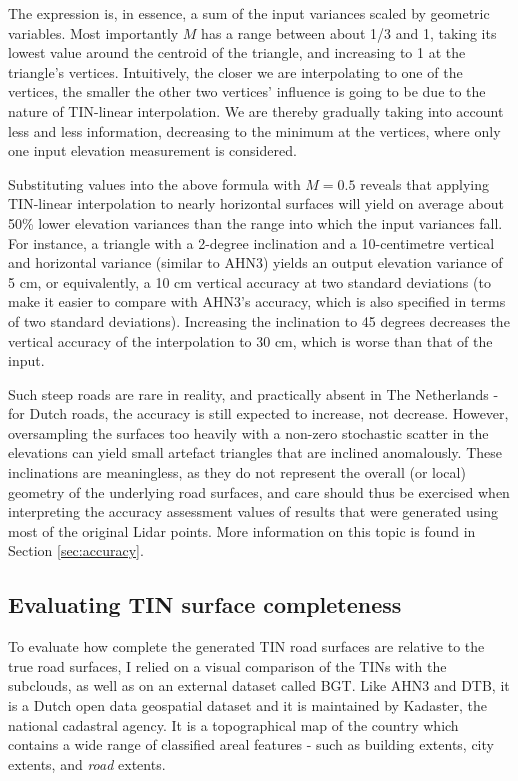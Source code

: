 The expression is, in essence, a sum of the input variances scaled by geometric variables. Most importantly $M$ has a range between about 1/3 and 1, taking its lowest value around the centroid of the triangle, and increasing to 1 at the triangle's vertices. Intuitively, the closer we are interpolating to one of the vertices, the smaller the other two vertices' influence is going to be due to the nature of TIN-linear interpolation. We are thereby gradually taking into account less and less information, decreasing to the minimum at the vertices, where only one input elevation measurement is considered.

Substituting values into the above formula with $M=0.5$ reveals that applying TIN-linear interpolation to nearly horizontal surfaces will yield on average about 50\% lower elevation variances than the range into which the input variances fall. For instance, a triangle with a 2-degree inclination and a 10-centimetre vertical and horizontal variance (similar to AHN3) yields an output elevation variance of 5 cm, or equivalently, a 10 cm vertical accuracy at two standard deviations (to make it easier to compare with AHN3's accuracy, which is also specified in terms of two standard deviations). Increasing the inclination to 45 degrees decreases the vertical accuracy of the interpolation to 30 cm, which is worse than that of the input.

Such steep roads are rare in reality, and practically absent in The Netherlands - for Dutch roads, the accuracy is still expected to increase, not decrease. However, oversampling the surfaces too heavily with a non-zero stochastic scatter in the elevations can yield small artefact triangles that are inclined anomalously. These inclinations are meaningless, as they do not represent the overall (or local) geometry of the underlying road surfaces, and care should thus be exercised when interpreting the accuracy assessment values of results that were generated using most of the original Lidar points. More information on this topic is found in Section \ref{sec:accuracy}.

\subsection{Evaluating TIN surface completeness}
\label{sub:m_accuracycompleteness}

To evaluate how complete the generated TIN road surfaces are relative to the true road surfaces, I relied on a visual comparison of the TINs with the subclouds, as well as on an external dataset called BGT. Like AHN3 and DTB, it is a Dutch open data geospatial dataset and it is maintained by Kadaster, the national cadastral agency. It is a topographical map of the country which contains a wide range of classified areal features - such as building extents, city extents, and \textit{road} extents.

